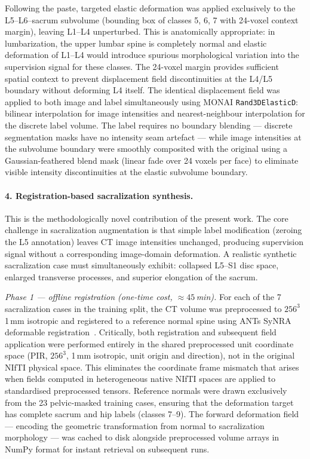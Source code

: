 \documentclass{article}
\begin{document}
Following the paste, targeted elastic deformation was applied exclusively to the
L5--L6--sacrum subvolume (bounding box of classes 5, 6, 7 with 24-voxel context
margin), leaving L1--L4 unperturbed. This is anatomically appropriate: in
lumbarization, the upper lumbar spine is completely normal and elastic deformation
of L1--L4 would introduce spurious morphological variation into the supervision
signal for these classes. The 24-voxel margin provides sufficient spatial context
to prevent displacement field discontinuities at the L4/L5 boundary without
deforming L4 itself. The identical displacement field was applied to both image
and label simultaneously using MONAI \texttt{Rand3DElasticD}: bilinear
interpolation for image intensities and nearest-neighbour interpolation for the
discrete label volume. The label requires no boundary blending --- discrete
segmentation masks have no intensity seam artefact --- while image intensities
at the subvolume boundary were smoothly composited with the original using a
Gaussian-feathered blend mask (linear fade over 24 voxels per face) to eliminate
visible intensity discontinuities at the elastic subvolume boundary.

\paragraph{4. Registration-based sacralization synthesis.}
This is the methodologically novel contribution of the present work. The core
challenge in sacralization augmentation is that simple label modification
(zeroing the L5 annotation) leaves CT image intensities unchanged, producing
supervision signal without a corresponding image-domain deformation. A
realistic synthetic sacralization case must simultaneously exhibit: collapsed
L5--S1 disc space, enlarged transverse processes, and superior elongation of
the sacrum.

\textit{Phase 1 --- offline registration (one-time cost, ${\approx}45$\,min).}
For each of the 7 sacralization cases in the training split, the CT volume was
preprocessed to $256^3$ 1\,mm isotropic and registered to a reference normal
spine using ANTs SyNRA deformable registration~\citep{avants2011}. Critically,
both registration and subsequent field application were performed entirely in
the shared preprocessed unit coordinate space (PIR, $256^3$, 1\,mm isotropic,
unit origin and direction), not in the original NIfTI physical space. This
eliminates the coordinate frame mismatch that arises when fields computed in
heterogeneous native NIfTI spaces are applied to standardised preprocessed
tensors. Reference normals were drawn exclusively from the 23 pelvic-masked
training cases, ensuring that the deformation target has complete sacrum and
hip labels (classes 7--9). The forward deformation field --- encoding the
geometric transformation from normal to sacralization morphology --- was cached
to disk alongside preprocessed volume arrays in NumPy format for instant
retrieval on subsequent runs.
\end{document}
